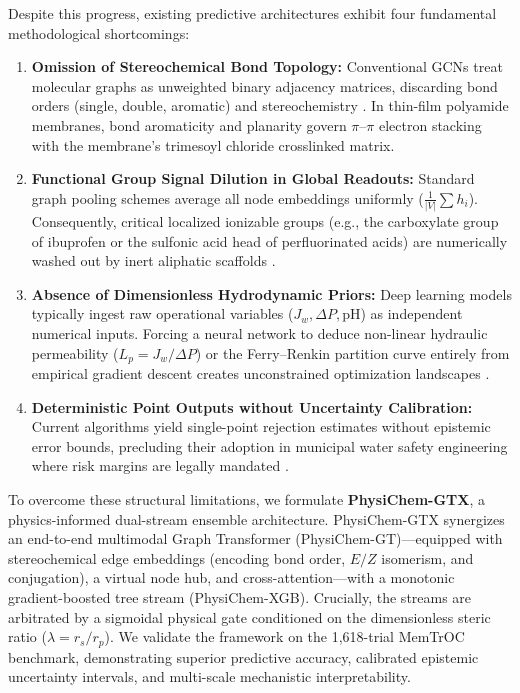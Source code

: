 \documentclass[11pt]{article}
\begin{document}
Despite this progress, existing predictive architectures exhibit four fundamental methodological shortcomings:
\begin{enumerate}[leftmargin=1.3em,itemsep=2pt,topsep=3pt]
\item \textbf{Omission of Stereochemical Bond Topology:} Conventional GCNs treat molecular graphs as unweighted binary adjacency matrices, discarding bond orders (single, double, aromatic) and stereochemistry \cite{kipf2017,hu2020}. In thin-film polyamide membranes, bond aromaticity and planarity govern $\pi$--$\pi$ electron stacking with the membrane's trimesoyl chloride crosslinked matrix.
\item \textbf{Functional Group Signal Dilution in Global Readouts:} Standard graph pooling schemes average all node embeddings uniformly ($\frac{1}{|V|}\sum h_i$). Consequently, critical localized ionizable groups (e.g., the carboxylate group of ibuprofen or the sulfonic acid head of perfluorinated acids) are numerically washed out by inert aliphatic scaffolds \cite{xu2019}.
\item \textbf{Absence of Dimensionless Hydrodynamic Priors:} Deep learning models typically ingest raw operational variables ($J_w, \Delta P, \mathrm{pH}$) as independent numerical inputs. Forcing a neural network to deduce non-linear hydraulic permeability ($L_p = J_w/\Delta P$) or the Ferry--Renkin partition curve entirely from empirical gradient descent creates unconstrained optimization landscapes \cite{karniadakis2021}.
\item \textbf{Deterministic Point Outputs without Uncertainty Calibration:} Current algorithms yield single-point rejection estimates without epistemic error bounds, precluding their adoption in municipal water safety engineering where risk margins are legally mandated \cite{gal2016}.
\end{enumerate}

To overcome these structural limitations, we formulate \textbf{PhysiChem-GTX}, a physics-informed dual-stream ensemble architecture. PhysiChem-GTX synergizes an end-to-end multimodal Graph Transformer (PhysiChem-GT)---equipped with stereochemical edge embeddings (encoding bond order, $E/Z$ isomerism, and conjugation), a virtual node hub, and cross-attention---with a monotonic gradient-boosted tree stream (PhysiChem-XGB). Crucially, the streams are arbitrated by a sigmoidal physical gate conditioned on the dimensionless steric ratio ($\lambda = r_s/r_p$). We validate the framework on the 1,618-trial MemTrOC benchmark, demonstrating superior predictive accuracy, calibrated epistemic uncertainty intervals, and multi-scale mechanistic interpretability.
\end{document}
